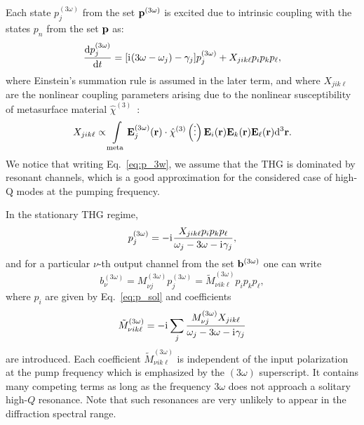 \documentclass[
    reprint,
    superscriptaddress,
    a4paper,
    amsmath,amssymb,
    prb,
]{revtex4-2}
\newcommand{\iu}{\mathrm{i}\mkern1mu}
\begin{document}
Each state ${p}_j^{(3\omega)}$ from the set ${\bf p}^{(3\omega)}$ is excited due to intrinsic coupling with the states $p_n$ from the set ${\bf p}$ as:
\begin{equation}\label{eq:p_3w}
	\frac{\dd {p}_j^{(3\omega)}}{\dd t } = [\iu(3\omega-\omega_j)- \gamma_j] p_j^{(3\omega)} + X_{jik\ell} p_{i}p_{k}p_{\ell}, 
\end{equation}
where Einstein's summation rule is assumed in the later term, and where $X_{jik\ell}$ are the nonlinear coupling parameters arising due to the nonlinear susceptibility of metasurface material $\hat{\chi}^{(3)}$~\cite[Appendix A]{Koshelev2024JOPT}:
\begin{equation}
	X_{jik\ell} 
	\propto \int \limits_{\text{meta}}  \mathbf{E}^{(3\omega)}_{j} (\mathbf{r}) \cdot  \hat{\chi}^{(3)} \left( \Shortstack{. . .} \right)   \mathbf{E}_{i} (\mathbf{r}) \mathbf{E}_{k} (\mathbf{r}) \mathbf{E}_{\ell } (\mathbf{r}) \dd^3 \mathbf{r}.
	\label{eq:X}
\end{equation}
We notice that writing Eq.~\eqref{eq:p_3w}, we assume that the THG is dominated by resonant channels, which is a good approximation for the considered case of high-Q modes at the pumping frequency.  



In the stationary THG regime, 
\begin{equation}
	p_{j}^{(3\omega)} = - \iu \frac{X_{jik\ell} p_{i}p_{k}p_{\ell}}{\omega_j - 3\omega - \iu \gamma_j},
\end{equation}
and for a particular $\nu$-th output channel from the set ${\bf b}^{(3\omega)}$ one can write 
\begin{equation}
	b_{\nu}^{(3\omega)} = M_{\nu j}^{(3\omega)} p_j^{(3\omega)} = \tilde{M}^{(3\omega)}_{\nu i k \ell} p_i p_k p_{\ell},
\end{equation}
where $p_i$ are given by Eq.~\eqref{eq:p_sol} and coefficients
\begin{equation}
	\tilde{M}^{(3\omega)}_{\nu i k \ell} = - \iu  \sum \limits_{j}\frac{M^{(3\omega)}_{\nu j} X_{jik\ell} }{ \omega_j - 3\omega - \iu \gamma_j}
\end{equation}
are introduced. Each coefficient $\tilde{M}^{(3\omega)}_{\nu i k \ell}$ is independent of the input polarization at the pump frequency which is emphasized by the $(3\omega)$ superscript. It contains many competing terms as long as the frequency $3\omega$ does not approach a solitary high-$Q$ resonance. Note that such resonances are very unlikely to appear in the diffraction spectral range.
\end{document}
